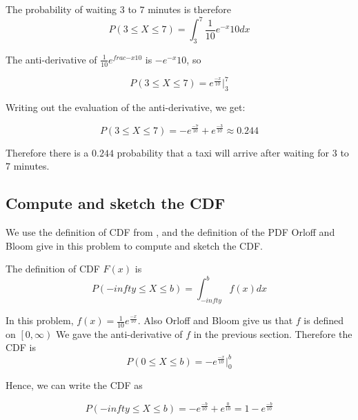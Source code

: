 \documentclass[a4paper,11pt]{article}
\begin{document}
The probability of waiting $3$ to $7$ minutes is therefore
\begin{equation}
P \left( 3 \leq X \leq 7 \right)
  = \int_{3}^{7} \frac{1}{10}e^{-x}{10} dx
\end{equation}

The anti-derivative of $\frac{1}{10}e^{frac{-x}{10}}$ is
$-e^{-x}{10}$, \cite{expInt}so

\begin{equation}
P \left( 3 \leq X \leq 7 \right)
  = e^{\frac{-x}{10}} \bigg\rvert_{3}^{7}
\end{equation}

Writing out the evaluation of the anti-derivative, we get:

\begin{equation}
P \left( 3 \leq X \leq 7 \right)
  = -e^{\frac{-7}{10}} + e^{\frac{-3}{10}} \approx 0.244
\end{equation}

Therefore there is a $0.244$ probability that a taxi will
arrive after waiting for $3$ to $7$ minutes.

\subsection{Compute and sketch the CDF}

We use the definition of CDF from \cite{reading5b}, and the definition
of the PDF Orloff and Bloom give in this problem to compute
and sketch the CDF.

The definition of CDF $F\left( x \right)$ is
\begin{equation}
P \left( -infty \leq X \leq b \right) = \int_{-infty}^{b} f \left( x \right) dx
\end{equation}

In this problem, $f \left( x \right) = \frac{1}{10}e^{\frac{-x}{10}}$. Also
Orloff and Bloom give us that $f$ is defined on $\left[ 0, \infty \right)$
We gave the anti-derivative of $f$ in the previous section.
Therefore the CDF is
\begin{equation}
P \left( 0 \leq X \leq b \right) = -e^{\frac{-x}{10}} \bigg\rvert_{0}^{b}
\end{equation}

Hence, we can write the CDF as

\begin{equation}
P \left( -infty \leq X \leq b \right)
  = -e^{\frac{-b}{10}} + e^{\frac{0}{10}}
  = 1 -e^{\frac{-b}{10}}
\end{equation}

\printbibliography{}
\end{document}
